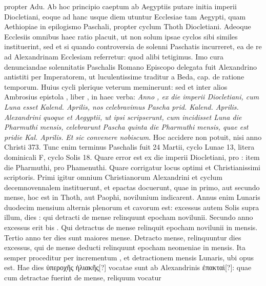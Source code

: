 propter Adu.
Ab hoc principio caeptum ab Aegyptiis putare initia
imperii Diocletiani, eoque ad hanc usque diem utuntur Ecclesiae tam
Aegypti, quam Aethiopiae in epilogismo Paschali, propter cyclum
Thoth Diocletiani.
%
Adeoque Ecclesiis omnibus haec ratio placuit,
ut non solum ipsae cyclos sibi similes instituerint, sed et si quando
controversia de solenni Paschatis incurreret, ea de re ad Alexandrinam
Ecclesiam referretur: quod alibi tetigimus.
Imo cura denunciandae
solennitatis Paschalis Romano Episcopo delegata fuit
Alexandrino antistiti per Imperatorem, ut luculentissime traditur a
Beda,  cap. %
 de ratione temporum.
Huius cycli plerique veterum
meminerunt: sed et inter alios Ambrosius epistola ,
 liber , %
in haec verba: \textit{Anno , ex die imperii Diocletiani,
 cum 
Luna esset  Kalend. Aprilis, nos celebravimus Pascha prid. Kalend.
Aprilis.}
\textit{Alexandrini quoque et Aegyptii, ut ipsi scripserunt,
 cum incidisset
 Luna  die Pharmuthi mensis, celebrarunt Pascha
quinta die Pharmuthi mensis, quae est pridie Kal. Aprilis.}
\textit{Et sic convenere
nobiscum}.
Hoc accidere non potuit, nisi anno Christi 373.
Tunc enim terminus Paschalis fuit 24 Martii, cyclo Lunae 13, litera
dominicali F, cyclo Solis 18.
Quare error est  ex die imperii
Diocletiani, pro : item  die Pharmuthi,
 pro Phamenuthi.
Quare corrigatur locus optimi et Christianissimi scriptoris.
Primi igitur omnium Christianorum Alexandrini et cyclum decemnovennalem
instituerunt, et epactas docuerunt, quae in primo, aut secundo
mense, hoc est in Thoth, aut Paophi, novilunium indicarent.
Annus enim Lunaris duodecim mensium alternis plenorum et cavorum
est: excessus autem Solis supra illum, dies : qui detracti de
mense relinquunt  epocham novilunii.
Secundo anno excessus
erit bis .
Qui detractus de mense relinquit epocham novilunii in
 mensis.
Tertio anno ter  dies sunt maiores mense.
Detracto
mense, relinquuntur  dies excessus, qui de mense deducti relinquunt
epocham neomeniae in  mensis.
Ita semper proceditur
per incrementum , et detractionem mensis Lunaris, ubi opus est.
Hae dies \textgreek{ὑπεροχῆς ἡλιακῆς[?]} vocatae sunt ab Alexandrinis
 \textgreek{ἐπακταὶ[?]}: quae
cum detractae fuerint de mense, reliquum vocatur
